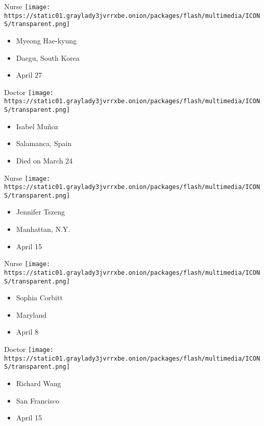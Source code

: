 \protect\hyperlink{item-myeong-hae-kyung}{}

Nurse
\texttt{[image: https://static01.graylady3jvrrxbe.onion/packages/flash/multimedia/ICONS/transparent.png]}

\begin{itemize}
\tightlist
\item
  Myeong Hae-kyung
\item
  Daegu, South Korea
\item
  April 27
\end{itemize}

\protect\hyperlink{item-isabel-munoz}{}

Doctor
\texttt{[image: https://static01.graylady3jvrrxbe.onion/packages/flash/multimedia/ICONS/transparent.png]}

\begin{itemize}
\tightlist
\item
  Isabel Muñoz
\item
  Salamanca, Spain
\item
  Died on March 24
\end{itemize}

\protect\hyperlink{item-jennifer-tszeng}{}

Nurse
\texttt{[image: https://static01.graylady3jvrrxbe.onion/packages/flash/multimedia/ICONS/transparent.png]}

\begin{itemize}
\tightlist
\item
  Jennifer Tszeng
\item
  Manhattan, N.Y.
\item
  April 15
\end{itemize}

\protect\hyperlink{item-sophia-corbitt}{}

Nurse
\texttt{[image: https://static01.graylady3jvrrxbe.onion/packages/flash/multimedia/ICONS/transparent.png]}

\begin{itemize}
\tightlist
\item
  Sophia Corbitt
\item
  Maryland
\item
  April 8
\end{itemize}

\protect\hyperlink{item-richard-wang}{}

Doctor
\texttt{[image: https://static01.graylady3jvrrxbe.onion/packages/flash/multimedia/ICONS/transparent.png]}

\begin{itemize}
\tightlist
\item
  Richard Wang
\item
  San Francisco
\item
  April 15
\end{itemize}

